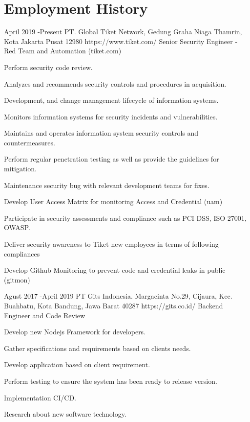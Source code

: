 \documentclass[10pt]{article} %
\begin{document}
\section{Employment History}

\job
{April 2019 -}{Present}
{PT. Global Tiket Network, Gedung Graha Niaga Thamrin, Kota Jakarta Pusat 12980}
{https://www.tiket.com/}
{Senior Security Engineer - Red Team and Automation (tiket.com)}
{
    \begin{itemize-noindent}

        \item{Perform security code review.} 
        \item{Analyzes and recommends security controls and procedures in acquisition.}
        \item{Development, and change management lifecycle of information systems.}
        \item{Monitors information systems for security incidents and vulnerabilities.}
        \item{Maintains and operates information system security controls and countermeasures.}
        \item{Perform regular penetration testing as well as provide the guidelines for mitigation.}
        \item{Maintenance security bug with relevant development teams for fixes.}
        \item{Develop User Access Matrix for monitoring Access and Credential (uam)}
        \item{Participate in security assessments and compliance such as PCI DSS, ISO 27001, OWASP.}
        \item{Deliver security awareness to Tiket new employees in terms of following compliances}
        \item{Develop Github Monitoring to prevent code and credential leaks in public (gitmon)}
    \end{itemize-noindent}

}

\job
{Agust 2017 -}{April 2019}
{PT Gits Indonesia.  Margacinta No.29, Cijaura, Kec. Buahbatu, Kota Bandung, Jawa Barat 40287}
{https://gits.co.id/}
{Backend Engineer and Code Review}
{

    \begin{itemize-noindent}
        \item{Develop new Nodejs Framework for developers.}
        \item{Gather specifications and requirements based on clients needs.}
        \item{Develop application based on client requirement.}
        \item{Perform testing to ensure the system has been ready to release version.}
        \item{Implementation CI/CD.}
        \item{Research about new software technology.}


    \end{itemize-noindent}

}
\end{document}
